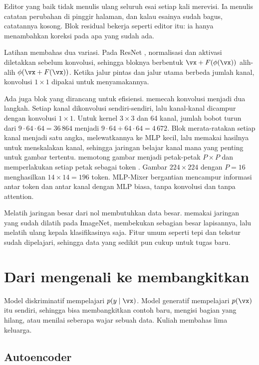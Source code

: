 Editor yang baik tidak menulis ulang seluruh esai setiap kali merevisi. Ia menulis catatan
perubahan di pinggir halaman, dan kalau esainya sudah bagus, catatannya kosong. Blok residual
bekerja seperti editor itu: ia hanya menambahkan koreksi pada apa yang sudah ada.

Latihan membahas dua variasi. Pada ResNet , normalisasi dan aktivasi
diletakkan sebelum konvolusi, sehingga bloknya berbentuk $\vx+F(\phi(\vx))$ alih-alih
$\phi(\vx+F(\vx))$. Ketika jalur pintas dan jalur utama berbeda jumlah kanal, konvolusi $1\times1$
dipakai untuk menyamakannya.

Ada juga blok yang dirancang untuk efisiensi.  memecah
konvolusi menjadi dua langkah. Setiap kanal dikonvolusi sendiri-sendiri, lalu kanal-kanal dicampur
dengan konvolusi $1\times1$. Untuk kernel $3\times3$ dan 64 kanal, jumlah bobot turun dari
$9\cdot64\cdot64=36\,864$ menjadi $9\cdot64+64\cdot64=4\,672$. Blok 
merata-ratakan setiap kanal menjadi satu angka, melewatkannya ke MLP kecil, lalu memakai hasilnya
untuk menskalakan kanal, sehingga jaringan belajar kanal mana yang penting untuk gambar tertentu.
 memotong gambar menjadi petak-petak $P\times P$ dan memperlakukan setiap
petak sebagai token \citep{dosovitskiy2021}. Gambar $224\times224$ dengan $P=16$ menghasilkan
$14\times14=196$ token. MLP-Mixer bergantian mencampur informasi antar token dan antar kanal
dengan MLP biasa, tanpa konvolusi dan tanpa attention.

Melatih jaringan besar dari nol membutuhkan data besar.  memakai jaringan
yang sudah dilatih pada ImageNet, membekukan sebagian besar lapisannya, lalu melatih ulang
kepala klasifikasinya saja. Fitur umum seperti tepi dan tekstur sudah dipelajari, sehingga data
yang sedikit pun cukup untuk tugas baru.

\section{Dari mengenali ke membangkitkan}

Model diskriminatif mempelajari $p(y\mid\vx)$. Model generatif mempelajari $p(\vx)$ itu sendiri,
sehingga bisa membangkitkan contoh baru, mengisi bagian yang hilang, atau menilai seberapa wajar
sebuah data. Kuliah membahas lima keluarga.

\subsection{Autoencoder}

